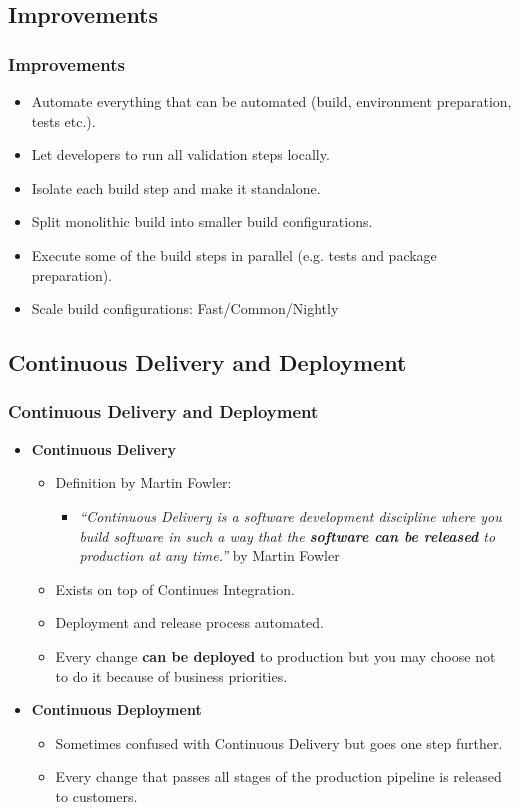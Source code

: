 \subsection[]{Improvements}
\begin{frame}
\frametitle{Improvements}
\begin{itemize}
	\item Automate everything that can be automated (build, environment preparation, tests etc.).
	\item Let developers to run all validation steps locally.
	\item Isolate each build step and make it standalone.
	\item Split monolithic build into smaller build configurations.
	\item Execute some of the build steps in parallel (e.g. tests and package preparation).
	\item Scale build configurations: Fast/Common/Nightly
\end{itemize}
\end{frame}

\subsection[]{Continuous Delivery and Deployment}
\begin{frame}
\frametitle{Continuous Delivery and Deployment}
\begin{itemize}
	\item \textbf{Continuous Delivery}
		\begin{itemize}%
		\item Definition by Martin Fowler:
			\begin{itemize}
			\item \emph{“Continuous Delivery is a software development discipline where you build software in such a way that the \textbf{software can be released} to production at any time.”} by Martin Fowler
			\end{itemize}
		\item Exists on top of Continues Integration.
		\item Deployment and release process automated.
		\item Every change \textbf{can be deployed} to production but you may choose not to do it because of business priorities.
		\end{itemize}
	\item \textbf{Continuous Deployment}
		\begin{itemize}
		\item Sometimes confused with Continuous Delivery but goes one step further.
		\item Every change that passes all stages of the production pipeline is released to customers.
		\end{itemize}
\end{itemize}
\end{frame}

